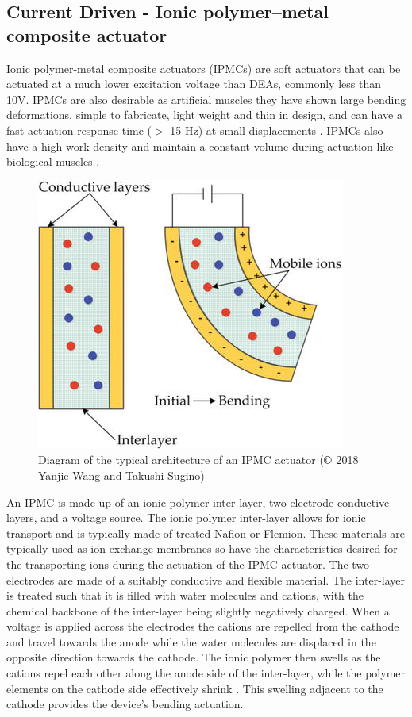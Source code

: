 \subsection{Current Driven - Ionic polymer–metal composite actuator}
Ionic polymer-metal composite actuators (IPMCs) are soft actuators that can be actuated at a much lower excitation voltage than DEAs, commonly less than 10V. IPMCs are also desirable as artificial muscles they have shown large bending deformations, simple to fabricate, light weight and thin in design, and can have a fast actuation response time ($>$ 15 Hz) at small displacements \citep{Ma2020}. IPMCs also have a high work density and maintain a constant volume during actuation like biological muscles \cite{Neuhaus2020}.
\begin{figure}[H]
  \centering
  \includegraphics[width=0.5\linewidth]{Figures/IPMC.png}
  \caption{Diagram of the typical architecture of an IPMC actuator \citep{Wang2018} ($\copyright$ 2018 Yanjie Wang and Takushi Sugino)}
  \label{fig:Artificial Muscle_IPMC}
\end{figure}
An IPMC is made up of an ionic polymer inter-layer, two electrode conductive layers, and a voltage source. The ionic polymer inter-layer allows for ionic transport and is typically made of treated Nafion or Flemion. These materials are typically used as ion exchange membranes so have the characteristics desired for the transporting ions during the actuation of the IPMC actuator. The two electrodes are made of a suitably conductive and flexible material. The inter-layer is treated such that it is filled with water molecules and cations, with the chemical backbone of the inter-layer being slightly negatively charged. When a voltage is applied across the electrodes the cations are repelled from the cathode and travel towards the anode while the water molecules are displaced in the opposite direction towards the cathode. The ionic polymer then swells as the cations repel each other along the anode side of the inter-layer, while the polymer elements on the cathode side effectively shrink \citep{Segalman1999}. This swelling adjacent to the cathode provides the device's bending actuation.

